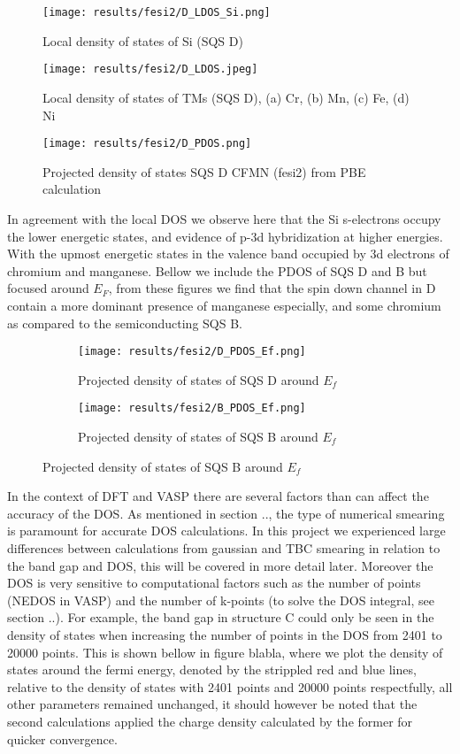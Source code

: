 \begin{figure}[H]
	\centering
	\texttt{[image: results/fesi2/D\_LDOS\_Si.png]}
	\caption{Local density of states of Si (SQS D)}
\end{figure} 

\begin{figure}[H]
	\centering
	\texttt{[image: results/fesi2/D\_LDOS.jpeg]}
	\caption{Local density of states of TMs (SQS D), (a) Cr, (b) Mn, (c) Fe, (d) Ni}
\end{figure} 

\begin{figure}[H]
	\centering
	\texttt{[image: results/fesi2/D\_PDOS.png]}
	\caption{Projected density of states SQS D CFMN (fesi2) from PBE calculation}
\end{figure} 

In agreement with the local DOS we observe here that the Si s-electrons occupy the lower energetic states, and evidence of p-3d hybridization at higher energies. With the upmost energetic states in the valence band occupied by 3d electrons of chromium and manganese. Bellow we include the PDOS of SQS D and B but focused around $E_F$, from these figures we find that the spin down channel in D contain a more dominant presence of manganese especially, and some chromium as compared to the semiconducting SQS B.  
  
\begin{figure}[H]
	\centering
	\begin{subfigure}{.45\textwidth}
			\texttt{[image: results/fesi2/D\_PDOS\_Ef.png]}
			\caption{Projected density of states of SQS D around $E_f$}		
	\end{subfigure}
	\hspace{0.5cm}
	\begin{subfigure}{.45\textwidth}
		\texttt{[image: results/fesi2/B\_PDOS\_Ef.png]}
		\caption{Projected density of states of SQS B around $E_f$}		
\end{subfigure}
\end{figure}

In the context of DFT and VASP there are several factors than can affect the accuracy of the DOS. As mentioned in section .., the type of numerical smearing is paramount for accurate DOS calculations. In this project we experienced large differences between calculations from gaussian and TBC smearing in relation to the band gap and DOS, this will be covered in more detail later. Moreover the DOS is very sensitive to computational factors such as the number of points (NEDOS in VASP) and the number of k-points (to solve the DOS integral, see section ..). For example, the band gap in structure C could only be seen in the density of states when increasing the number of points in the DOS from 2401 to 20000 points. This is shown bellow in figure blabla, where we plot the density of states around the fermi energy, denoted by the strippled red and blue lines, relative to the density of states with 2401 points and 20000 points respectfully, all other parameters remained unchanged, it should however be noted that the second calculations applied the charge density calculated by the former for quicker convergence. 

